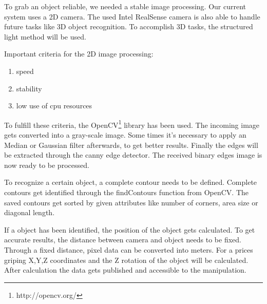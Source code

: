 To grab an object reliable, we needed a stable image processing. Our current system uses a 2D camera. The used Intel RealSense camera is also able to handle future tasks like 3D object recognition. To accomplish 3D tasks, the structured light method will be used.

Important criteria for the 2D image processing:

\begin{enumerate}
	\item speed
	\item stability
	\item low use of cpu resources
\end{enumerate}

To fulfill these criteria, the OpenCV\footnote{http://opencv.org/} library has been used. The incoming image gets converted into a gray-scale image. Some times it's necessary to apply an Median or Gaussian filter afterwards, to get better results. Finally the edges will be extracted through the canny edge detector. The received binary edges image is now ready to be processed.

To recognize a certain object, a complete contour needs to be defined. Complete contours get identified through the findContours function from OpenCV. The saved contours get sorted by given attributes like number of corners, area size or diagonal length.

If a object has been identified, the position of the object gets calculated. To get accurate results, the distance between camera and object needs to be fixed. Through a fixed distance, pixel data can be converted into meters. For a prices griping X,Y,Z coordinates and the Z rotation of the object will be calculated. After calculation the data gets published and accessible to the manipulation.


